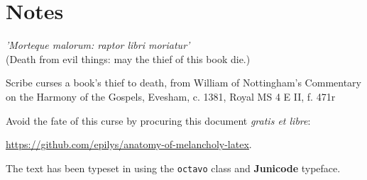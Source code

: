 \documentclass[titlepage,12pt,superroyal]{octavo}
\begin{document}
\chapter{Notes}
\backmatter
{}
\nocite{*}
\thispagestyle{empty}
\clearpage
\thispagestyle{empty}
\colophontitlesize{18pt}
\colophonparsize{10pt}
\begin{colophon}
\epigraph{\footnotesize\textit{'Morteque malorum: raptor libri moriatur'}\\(Death from evil things: may the thief of this book die.)}{\scriptsize{}Scribe curses a book’s thief to death, from William of Nottingham’s Commentary on the Harmony of the Gospels, Evesham, c. 1381, Royal MS 4 E II, f. 471r}
Avoid the fate of this curse by procuring this document \emph{gratis et libre}:

  \href{https://github.com/epilys/anatomy-of-melancholy-latex}{\underline{https://github.com/epilys/anatomy-of-melancholy-latex}}.

  The text has been typeset in \XeLaTeX{} using the \texttt{octavo} class and \textbf{Junicode} typeface.
\end{colophon}
\clearpage{}
 \label{backcover}
\end{document}
